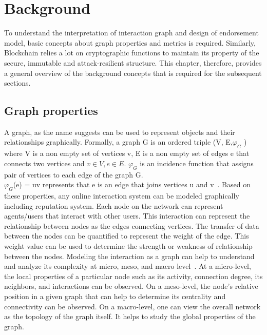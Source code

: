 \chapter{Background} \label{ch:background}
To understand the interpretation of interaction graph and design of endorsement
model, basic concepts about graph properties and metrics is required.
Similarly, Blockchain relies a lot on cryptographic functions to maintain its
property of the secure, immutable and attack-resilient structure. This chapter,
therefore, provides a general overview of the background concepts that is
required for the subsequent sections. 

\section{Graph properties}
A graph, as the name suggests can be used to represent objects and their
relationships graphically. Formally, a graph G is an ordered triple (V,
E,$\varphi _G$ ) where V is a non empty set of vertices v, E is a non empty set
of edges e that connects two vertices and $v \in V, e \in E$. $\varphi _G$ is
an incidence function that assigns pair of vertices to each edge of the graph
G.\\ $\varphi _G $(e) = uv represents that e is an edge that joins vertices u
and v~\cite{bondy1976graph}.  Based on these properties, any online interaction
system can be modeled graphically including reputation system. Each node on the
network can represent agents/users that interact with other users. This
interaction can represent the relationship between nodes as the edges
connecting vertices. The transfer of data between the nodes can be quantified
to represent the weight of the edge.  This weight value can be used to
determine the strength or weakness of relationship between the nodes.  Modeling
the interaction as a graph can help to understand and analyze its complexity at
micro, meso, and macro level~\cite{gkorou2014exploiting}. At a micro-level, the
local properties of a particular node such as its activity, connection degree,
its neighbors, and interactions can be observed. On a meso-level, the node's
relative position in a given graph that can help to determine its centrality
and connectivity can be observed. On a macro-level, one can view the overall
network as the topology of the graph itself. It helps to study the global
properties of the graph.\\ 
